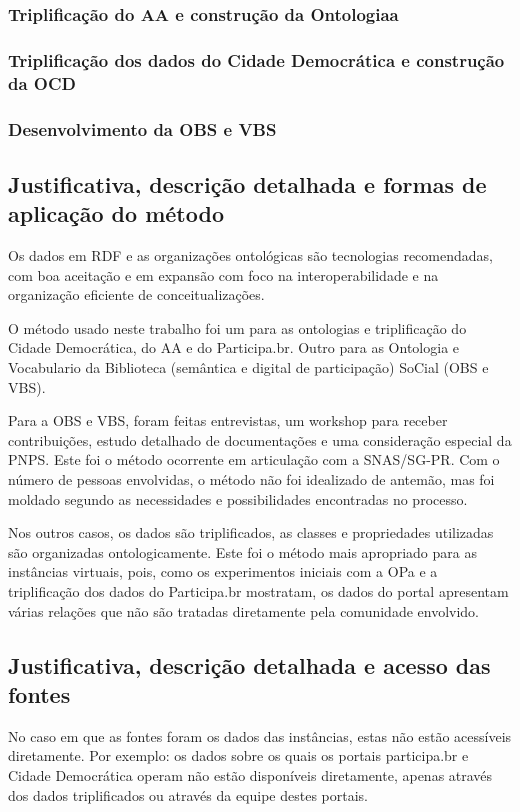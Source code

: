 \documentclass[12pt]{article}
\begin{document}
\subsubsection{Triplificação do AA e construção da Ontologiaa}
\subsubsection{Triplificação dos dados do Cidade Democrática e construção da OCD}
\subsubsection{Desenvolvimento da OBS e VBS}
\subsection{Justificativa, descrição detalhada e formas de aplicação do método}
Os dados em RDF e as organizações ontológicas são tecnologias recomendadas, com boa aceitação e em expansão com foco na interoperabilidade e na organização eficiente de conceitualizações.

O método usado neste trabalho foi um para as ontologias e triplificação do Cidade Democrática, do AA e do Participa.br. Outro para as Ontologia e Vocabulario da Biblioteca (semântica e digital de participação) SoCial (OBS e VBS).

Para a OBS e VBS, foram feitas entrevistas, um workshop para receber contribuições, estudo detalhado de documentações e uma consideração especial da PNPS. Este foi o método ocorrente em articulação com a SNAS/SG-PR. Com o número de pessoas envolvidas, o método não foi idealizado de antemão, mas foi moldado segundo as necessidades e possibilidades encontradas no processo.

Nos outros casos, os dados são triplificados, as classes e propriedades utilizadas são organizadas ontologicamente. Este foi o método mais apropriado para as instâncias virtuais, pois, como os experimentos iniciais com a OPa e a triplificação dos dados do Participa.br mostratam, os dados do portal apresentam várias relações que não são tratadas diretamente pela comunidade envolvido.

\subsection{Justificativa, descrição detalhada e acesso das fontes}
No caso em que as fontes foram os dados das instâncias, estas não estão acessíveis diretamente. Por exemplo: os dados sobre os quais os portais participa.br e Cidade Democrática operam não estão disponíveis diretamente, apenas através dos dados triplificados ou através da equipe destes portais.
\end{document}
